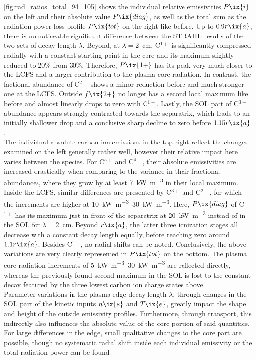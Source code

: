 %
            \cref{fig:rad_ratios_total_94_105} shows the individual relative emissivities $P\ix{i}$ on the left and their absolute value $P\ix{diag}$, as well as the total sum as the radiation power loss profile $P\ix{tot}$ on the right like before. Up to $0.9r\ix{a}$, there is no noticeable significant difference between the STRAHL results of the two sets of decay length $\lambda$. Beyond, at $\lambda=$\SI{2}{\centi\meter}, C$^{1+}$ is significantly compressed radially with a constant starting point in the core and its maximum slightly reduced to 20\% from 30\%. Therefore, $P\ix{1+}$ has its peak very much closer to the LCFS and a larger contribution to the plasma core radiation. In contrast, the factional abundance of C$^{2+}$ shows a minor reduction before and much stronger one at the LCFS. Outside  $f\ix{2+}$ no longer has a second local maximum like before and almost linearly drops to zero with C$^{1+}$. Lastly, the SOL part of C$^{3+}$ abundance appears strongly contracted towards the separatrix, which leads to an initially shallower drop and a conclusive sharp decline to zero before $1.15r\ix{a}$.\\%
            The individual absolute carbon ion emissions in the top right reflect the changes examined on the left generally rather well, however their relative impact here varies between the species. For C$^{5+}$ and C$^{4+}$, their absolute emissivities are increased drastically when comparing to the variance in their fractional abundances, where they grow by at least \SI{7}{\kilo\watt\per\cubic\meter} in their local maximum. Inside the LCFS, similar differences are presented by C$^{3+}$ and C$^{2+}$, for which the increments are higher at \SIrange{10}{30}{\kilo\watt\per\cubic\meter}. Here, $P\ix{diag}$ of C$^{1+}$ has its maximum just in front of the separatrix at \SI{20}{\kilo\watt\per\cubic\meter} instead of in the SOL for $\lambda=$\SI{2}{\centi\meter}. Beyond $r\ix{a}$, the latter three ionization stages all decrease with a constant decay length equally, before reaching zero around $1.1r\ix{a}$. Besides C$^{1+}$, no radial shifts can be noted. Conclusively, the above variations are very clearly represented in $P\ix{tot}$ on the bottom. The plasma core radiation increments of \SIrange{5}{30}{\kilo\watt\per\cubic\meter} are reflected directly, whereas the previously found second maximum in the SOL is lost to the constant decay featured by the three lowest carbon ion charge states above.\\%
            Parameter variations in the plasma edge decay length $\lambda$, through changes in the SOL part of the kinetic inputs $n\ix{e}$ and $T\ix{e}$, greatly impact the shape and height of the outside emissivity profiles. Furthermore, through transport, this indirectly also influences the absolute value of the core portion of said quantities. For large differences in the edge, small qualitative changes to the core part are possible, though no systematic radial shift inside each individual emissivity or the total radiation power can be found.%
%
